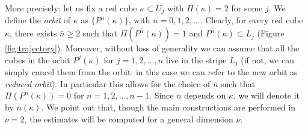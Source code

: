 \documentclass[12 pt]{article}
\theoremstyle{definition} \newtheorem{definition}{Definition}[section]
\theoremstyle{definition} \newtheorem{remark}[definition]{Remark}
\theoremstyle{plain} \newtheorem{lemma}[definition]{Lemma}
\theoremstyle{plain} \newtheorem{proposition}[definition]{Proposition}
\theoremstyle{plain} \newtheorem{theorem}[definition]{Theorem}
\theoremstyle{plain} \newtheorem{corollary}[definition]{Corollary}
\theoremstyle{definition} \newtheorem{example}[definition]{Example}
\theoremstyle{definition} \newtheorem{assumption}[definition]{Assumption}
\theoremstyle{definition} \newtheorem{conjecture}[definition]{Conjecture}
\newcommand{\1}{\mathbbm 1}
\numberwithin{equation}{section}
\begin{document}
    \medskip
    
   More precisely: let us fix a red cube $\kappa\subset U_j$ with $\Pi(\kappa)=2$ for some $j$. We define the \emph{orbit} of $\kappa$ as $\lbrace P^n(\kappa)\rbrace$, with $n=0,1,2,\dots$. Clearly, for every red cube $\kappa$, there exists $\bar n\geq 2$ such that $\Pi (P^{\bar n}(\kappa))=1$ and $P^{\bar n}(\kappa)\subset L_j$ (Figure \ref{fig:trajectory}). Moreover, 
   without loss of generality we can assume that all the cubes in the  orbit $P^j(\kappa)$ for $j=1,2,\dots, n$ live in the stripe $L_j$ (if not, we can simply cancel them from the orbit: in this case we can refer to the new orbit as \emph{reduced orbit}). In particular this allows for the choice of $\bar n$ such that $\Pi(P^n(\kappa))=0$ for $n=1,2,\dots,\bar n-1$. Since $\bar n$ depends on $\kappa$, we will denote it by $\bar n(\kappa)$. We point out that, though the main constructions are performed in $\nu=2$, the estimates will be computed for a general dimension $\nu$.
    
\end{document}
